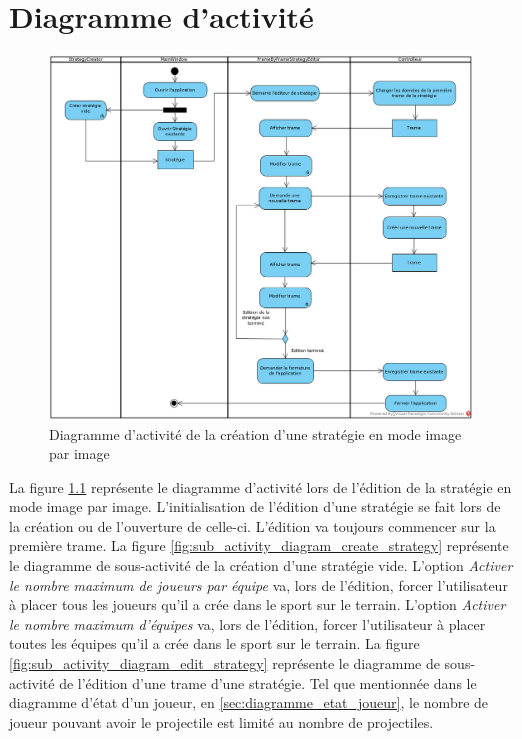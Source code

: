 
\chapter{Diagramme d'activité}
\label{s:diagramme_activite}

\begin{figure}[htpb]
    \centering
    \includegraphics[scale=0.60]{fig/activity_diagram_imagepimage.png}
    \caption{Diagramme d'activité de la création d'une stratégie en mode image par image}
    \label{fig:activity_diagram_imagepimage}
\end{figure}

La figure \ref{fig:activity_diagram_imagepimage} représente le diagramme d'activité lors de l'édition de la stratégie en mode image par image.
L'initialisation de l'édition d'une stratégie se fait lors de la création ou de l'ouverture de celle-ci.
L'édition va toujours commencer sur la première trame.
La figure \ref{fig:sub_activity_diagram_create_strategy} représente le diagramme de sous-activité de la création d'une stratégie vide.
L'option \textit{Activer le nombre maximum de joueurs par équipe} va, lors de l'édition, forcer l'utilisateur à placer tous les joueurs qu'il a crée dans le sport sur le terrain.
L'option \textit{Activer le nombre maximum d'équipes} va, lors de l'édition, forcer l'utilisateur à placer toutes les équipes qu'il a crée dans le sport sur le terrain.
La figure \ref{fig:sub_activity_diagram_edit_strategy} représente le diagramme de sous-activité de l'édition d'une trame d'une stratégie.
Tel que mentionnée dans le diagramme d'état d'un joueur, en \ref{sec:diagramme_etat_joueur}, le nombre de joueur pouvant avoir le projectile est limité au nombre de projectiles.

